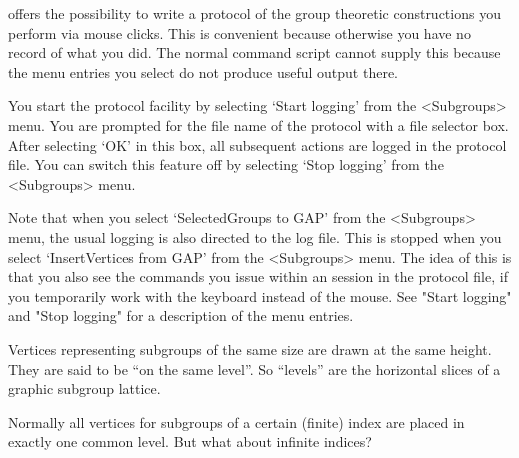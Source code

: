 





\label{loggingfacility}
{\XGAP} offers the possibility to write a protocol of the group
theoretic constructions you perform via mouse clicks. This is
convenient because otherwise you have no record of what you did. The
normal {\GAP} command script cannot supply this because the menu
entries you select do not produce useful output there.

You start the protocol facility by selecting `Start logging' from the
<Subgroups> menu. You are prompted for the file name of the protocol with 
a file selector box. After selecting `OK' in this box, all subsequent
actions are logged in the protocol file. You can switch this feature
off by selecting `Stop logging' from the <Subgroups> menu.

Note that when you select `SelectedGroups to GAP' from the <Subgroups> 
menu, the usual {\GAP} logging is also directed to the {\XGAP} log
  file. This is stopped when you select `InsertVertices from GAP' from 
  the <Subgroups> menu. The idea of this is that you also see the
  {\GAP} commands you issue within an {\XGAP} session in the {\XGAP}
  protocol file, if you temporarily work with the keyboard instead of
  the mouse. See "Start logging" and "Stop logging" for a description
  of the menu entries.



\label{levelsintro}
Vertices representing subgroups of the same size are drawn at the same
height. They are said to be ``on the same level''.  So ``levels'' are
the horizontal slices of a graphic subgroup lattice.

Normally all vertices for subgroups of a certain (finite) index are
placed in exactly one common level. But what about infinite indices?


